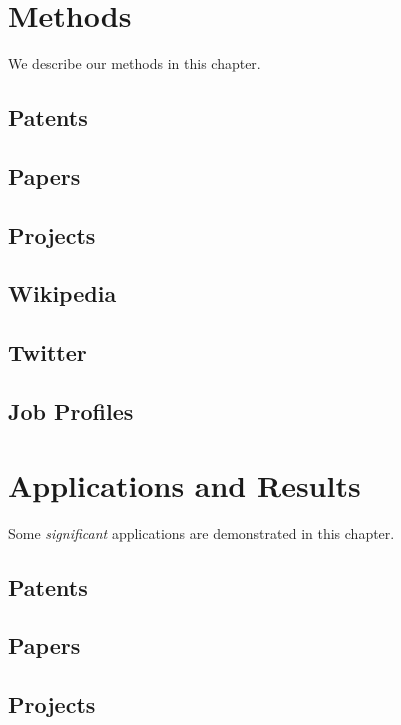 \documentclass[]{book}
\begin{document}
\chapter{Methods}\label{methods}

We describe our methods in this chapter.

\section{Patents}\label{patents-1}

\section{Papers}\label{papers-1}

\section{Projects}\label{projects-1}

\section{Wikipedia}\label{wikipedia-1}

\section{Twitter}\label{twitter-1}

\section{Job Profiles}\label{job-profiles-1}

\chapter{Applications and Results}\label{applications-and-results}

Some \emph{significant} applications are demonstrated in this chapter.

\section{Patents}\label{patents-2}

\section{Papers}\label{papers-2}

\section{Projects}\label{projects-2}
\end{document}
